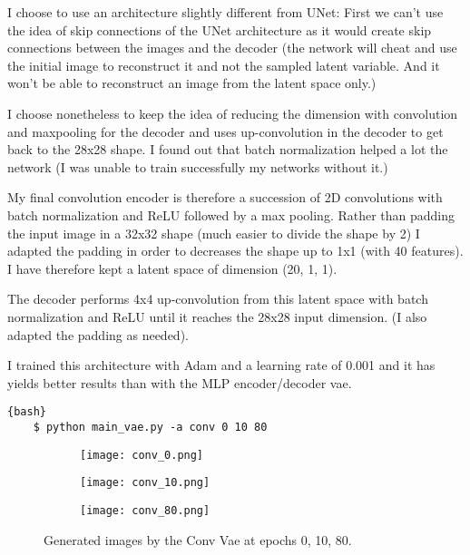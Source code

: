 \documentclass{article}
\begin{document}
I choose to use an architecture slightly different from UNet: First we can't use the idea of skip connections of the UNet architecture as it
would create skip connections between the images and the decoder (the network will cheat and use the initial image to reconstruct it and not
the sampled latent variable. And it won't be able to reconstruct an image from the latent space only.)

I choose nonetheless to keep the idea of reducing the dimension with convolution and maxpooling for the decoder and uses up-convolution in
the decoder to get back to the 28x28 shape. I found out that batch normalization helped a lot the network (I was unable to train
successfully my networks without it.)

My final convolution encoder is therefore a succession of 2D convolutions with batch normalization and ReLU followed by a max pooling. Rather
than padding the input image in a 32x32 shape (much easier to divide the shape by 2) I adapted the padding in order to decreases the shape
up to 1x1 (with 40 features). I have therefore kept a latent space of dimension (20, 1, 1).

The decoder performs 4x4 up-convolution from this latent space with batch normalization and ReLU until it reaches the 28x28 input dimension.
(I also adapted the padding as needed).

I trained this architecture with Adam and a learning rate of 0.001 and it has yields better results than with the MLP encoder/decoder vae.

\begin{lstlisting}{bash}
    $ python main_vae.py -a conv 0 10 80
\end{lstlisting}

\begin{figure}[ht]
    \centering
    \begin{subfigure}[b]{0.3\linewidth}
        \texttt{[image: conv\_0.png]}
    \end{subfigure}
    \begin{subfigure}[b]{0.3\linewidth}
        \texttt{[image: conv\_10.png]}
    \end{subfigure}
    \begin{subfigure}[b]{0.3\linewidth}
        \texttt{[image: conv\_80.png]}
    \end{subfigure}
    \caption{Generated images by the Conv Vae at epochs 0, 10, 80.}
    \label{fig:conv}
\end{figure}
\end{document}
